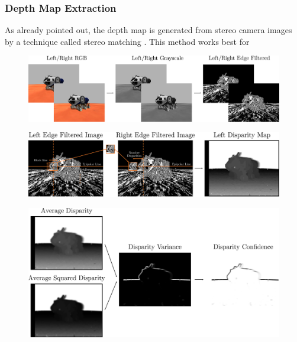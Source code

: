 \subsubsection{Depth Map Extraction}
As already pointed out, the depth map is generated from stereo camera images by a technique called stereo matching \cite{hamzah2010sum}. This method works best for  
\begin{figure}[h]
	\centering
	\includegraphics[scale=.28]{chapters/03_background/img/image_preprocessing.png}
	\caption{}
	\label{fig::323_image_preprocessing}
\end{figure}
\begin{figure}[h]
	\centering
	\includegraphics[scale=.28]{chapters/03_background/img/left_disparity_map.png}
	\caption{}
	\label{fig::323_left_disparity_map}
\end{figure}
\begin{figure}[h]
	\centering
	\includegraphics[scale=.28]{chapters/03_background/img/confidence_map.png}
	\caption{}
	\label{fig::323_confidence_map}
\end{figure}
